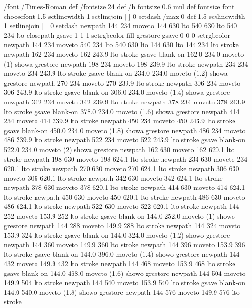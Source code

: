 /font /Times-Roman def /fontsize  24 def
/h fontsize 0.6 mul def %
fontsize font choosefont
  1.5 setlinewidth 1 setlinejoin [ ] 0 setdash
/max 0 def 
  1.5 setlinewidth 1 setlinejoin [ ] 0 setdash
newpath 144 234 moveto 144 630 lto
 540 630 lto
 540 234 lto closepath gsave 1 1 1 setrgbcolor fill grestore
gsave  0 0 0 setrgbcolor
newpath 144 234 moveto 540 234 lto
 540 630 lto
 144 630 lto
 144 234 lto stroke
newpath 162 234 moveto 162 243.9 lto stroke
gsave blank-on    162.0   234.0 moveto (1) showa  grestore
newpath 198 234 moveto 198 239.9 lto stroke
newpath 234 234 moveto 234 243.9 lto stroke
gsave blank-on    234.0   234.0 moveto (1.2) showa  grestore
newpath 270 234 moveto 270 239.9 lto stroke
newpath 306 234 moveto 306 243.9 lto stroke
gsave blank-on    306.0   234.0 moveto (1.4) showa  grestore
newpath 342 234 moveto 342 239.9 lto stroke
newpath 378 234 moveto 378 243.9 lto stroke
gsave blank-on    378.0   234.0 moveto (1.6) showa  grestore
newpath 414 234 moveto 414 239.9 lto stroke
newpath 450 234 moveto 450 243.9 lto stroke
gsave blank-on    450.0   234.0 moveto (1.8) showa  grestore
newpath 486 234 moveto 486 239.9 lto stroke
newpath 522 234 moveto 522 243.9 lto stroke
gsave blank-on    522.0   234.0 moveto (2) showa  grestore
newpath 162 630 moveto 162 620.1 lto stroke
newpath 198 630 moveto 198 624.1 lto stroke
newpath 234 630 moveto 234 620.1 lto stroke
newpath 270 630 moveto 270 624.1 lto stroke
newpath 306 630 moveto 306 620.1 lto stroke
newpath 342 630 moveto 342 624.1 lto stroke
newpath 378 630 moveto 378 620.1 lto stroke
newpath 414 630 moveto 414 624.1 lto stroke
newpath 450 630 moveto 450 620.1 lto stroke
newpath 486 630 moveto 486 624.1 lto stroke
newpath 522 630 moveto 522 620.1 lto stroke
newpath 144 252 moveto 153.9 252 lto stroke
gsave blank-on    144.0   252.0 moveto (1) showo  grestore
newpath 144 288 moveto 149.9 288 lto stroke
newpath 144 324 moveto 153.9 324 lto stroke
gsave blank-on    144.0   324.0 moveto (1.2) showo  grestore
newpath 144 360 moveto 149.9 360 lto stroke
newpath 144 396 moveto 153.9 396 lto stroke
gsave blank-on    144.0   396.0 moveto (1.4) showo  grestore
newpath 144 432 moveto 149.9 432 lto stroke
newpath 144 468 moveto 153.9 468 lto stroke
gsave blank-on    144.0   468.0 moveto (1.6) showo  grestore
newpath 144 504 moveto 149.9 504 lto stroke
newpath 144 540 moveto 153.9 540 lto stroke
gsave blank-on    144.0   540.0 moveto (1.8) showo  grestore
newpath 144 576 moveto 149.9 576 lto stroke
